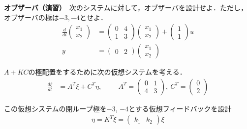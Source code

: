 \documentclass[a4paper,11pt,fleqn]{jreport}
\begin{document}
\newpage
\noindent
{\bf オブザーバ（演習）}　次のシステムに対して，オブザーバを設計せよ．ただし，オブザーバの極は$-3,-4$とせよ．
\begin{align*}
	\frac{d}{dt}
	\left (
	\begin{array}{c}
	 x_1 \\ x_2 
	\end{array}
	\right )
	& = 
	\left (
	\begin{array}{cc}
	 0 & 4 \\
	 1 & 3
	\end{array}
	\right )
	\left (
	\begin{array}{c}
	 x_1 \\ x_2 
	\end{array}
	\right )
	+
	\left (
	\begin{array}{c}
	 1 \\ 1 
	\end{array}
	\right )
	u
\\
	y&=
	\left ( \begin{array}{cc}
		0 & 2 
	\end{array} \right )
	\left (	\begin{array}{c}
		x_1 \\ x_2 
	\end{array} \right )
\end{align*}

$A+KC$の極配置をするために次の仮想システムを考える．
\begin{align*}
 \frac{d \xi}{dt} & = A^T \xi + C^T \eta, 
\hspace{1cm}
	A^T =
	\left (
	\begin{array}{cc}
	 0 & 1 \\
	 4 & 3
	\end{array}
	\right )
	, \ 
	C^T = 
	\left (
	\begin{array}{c}
	 0 \\ 2 
	\end{array}
	\right )
\end{align*}

この仮想システムの閉ループ極を$-3$, $-4$とする仮想フィードバックを設計
\begin{align*}
 \eta =  K^T \xi
	=
	\left ( \begin{array}{cc}
		k_1 & k_2 
	\end{array} \right )
	\xi
\end{align*}
\end{document}
